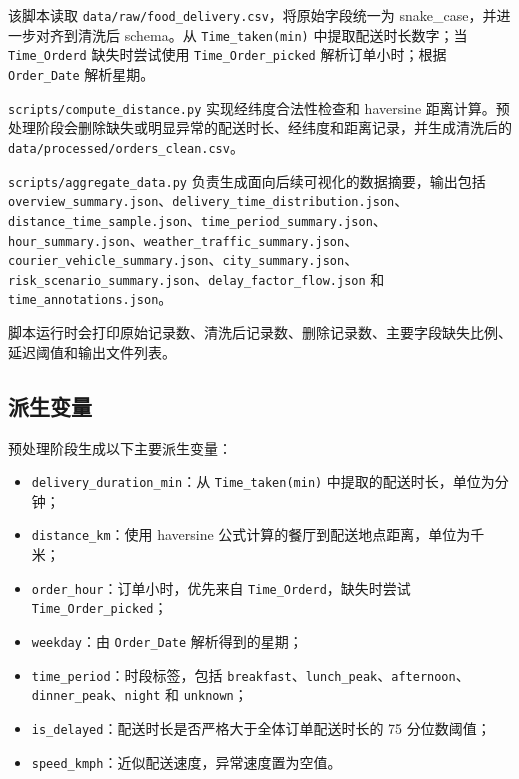 \documentclass[UTF8, a4paper, 12pt, fontset=fandol]{ctexart}
\begin{document}
该脚本读取 \texttt{data/raw/food\_delivery.csv}，将原始字段统一为 snake\_case，并进一步对齐到清洗后 schema。从 \texttt{Time\_taken(min)} 中提取配送时长数字；当 \texttt{Time\_Orderd} 缺失时尝试使用 \texttt{Time\_Order\_picked} 解析订单小时；根据 \texttt{Order\_Date} 解析星期。

\texttt{scripts/compute\_distance.py} 实现经纬度合法性检查和 haversine 距离计算。预处理阶段会删除缺失或明显异常的配送时长、经纬度和距离记录，并生成清洗后的 \texttt{data/processed/orders\_clean.csv}。

\texttt{scripts/aggregate\_data.py} 负责生成面向后续可视化的数据摘要，输出包括 \texttt{overview\_summary.json}、\texttt{delivery\_time\_distribution.json}、\texttt{distance\_time\_sample.json}、\texttt{time\_period\_summary.json}、\texttt{hour\_summary.json}、\texttt{weather\_traffic\_summary.json}、\texttt{courier\_vehicle\_summary.json}、\texttt{city\_summary.json}、\texttt{risk\_scenario\_summary.json}、\texttt{delay\_factor\_flow.json} 和 \texttt{time\_annotations.json}。

脚本运行时会打印原始记录数、清洗后记录数、删除记录数、主要字段缺失比例、延迟阈值和输出文件列表。

\subsection{派生变量}

预处理阶段生成以下主要派生变量：

\begin{itemize}[leftmargin=2em]
  \item \texttt{delivery\_duration\_min}：从 \texttt{Time\_taken(min)} 中提取的配送时长，单位为分钟；
  \item \texttt{distance\_km}：使用 haversine 公式计算的餐厅到配送地点距离，单位为千米；
  \item \texttt{order\_hour}：订单小时，优先来自 \texttt{Time\_Orderd}，缺失时尝试 \texttt{Time\_Order\_picked}；
  \item \texttt{weekday}：由 \texttt{Order\_Date} 解析得到的星期；
  \item \texttt{time\_period}：时段标签，包括 \texttt{breakfast}、\texttt{lunch\_peak}、\texttt{afternoon}、\texttt{dinner\_peak}、\texttt{night} 和 \texttt{unknown}；
  \item \texttt{is\_delayed}：配送时长是否严格大于全体订单配送时长的 75 分位数阈值；
  \item \texttt{speed\_kmph}：近似配送速度，异常速度置为空值。
\end{itemize}
\end{document}
